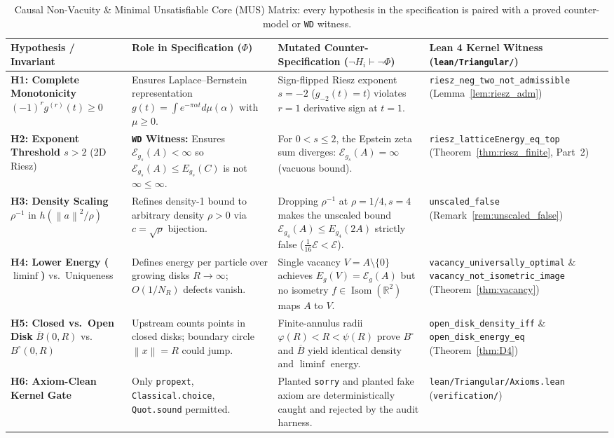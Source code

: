 \documentclass[11pt, a4paper]{article}
\theoremstyle{definition}
\theoremstyle{remark}
\newcommand{\R}{\mathbb{R}}
\newcommand{\Ecal}{\mathcal{E}}
\newcommand{\Bbar}{\overline{B}}
\newcommand{\Bopen}{B^{\circ}}
\newcommand{\norm}[1]{\left\lVert #1 \right\rVert}
\begin{document}
\begin{table}[htbp]
\centering
\small
\begin{tabular}{@{}>{\raggedright\arraybackslash}p{2.7cm}>{\raggedright\arraybackslash}p{3.8cm}>{\raggedright\arraybackslash}p{4.8cm}>{\raggedright\arraybackslash}p{3.9cm}@{}}
\toprule
\textbf{Hypothesis / Invariant} & \textbf{Role in Specification ($\Phi$)} & \textbf{Mutated Counter-Specification ($\neg H_i \vdash \neg \Phi$)} & \textbf{Lean 4 Kernel Witness (\texttt{lean/Triangular/})} \\
\midrule
\textbf{H1: Complete Monotonicity} $(-1)^r g^{(r)}(t) \ge 0$ & Ensures Laplace--Bernstein representation $g(t) = \int e^{-\pi\alpha t} d\mu(\alpha)$ with $\mu \ge 0$. & Sign-flipped Riesz exponent $s = -2$ ($g_{-2}(t) = t$) violates $r=1$ derivative sign at $t=1$. & \texttt{riesz\_neg\_two\_not\_admissible} (Lemma~\ref{lem:riesz_adm}) \\[0.5em]
\textbf{H2: Exponent Threshold $s > 2$} (2D Riesz) & \textbf{\texttt{WD} Witness:} Ensures $\Ecal_{g_s}(A) < \infty$ so $\Ecal_{g_s}(A) \le E_{g_s}(C)$ is not $\infty \le \infty$. & For $0 < s \le 2$, the Epstein zeta sum diverges: $\Ecal_{g_s}(A) = \infty$ (vacuous bound). & \texttt{riesz\_latticeEnergy\_eq\_top} (Theorem~\ref{thm:riesz_finite}, Part~2) \\[0.5em]
\textbf{H3: Density Scaling $\rho^{-1}$} in $h(\norm{a}^2/\rho)$ & Refines density-1 bound to arbitrary density $\rho > 0$ via $c = \sqrt{\rho}$ bijection. & Dropping $\rho^{-1}$ at $\rho = 1/4, s = 4$ makes the unscaled bound $\Ecal_{g_4}(A) \le E_{g_4}(2A)$ strictly false ($\frac{1}{16}\Ecal < \Ecal$). & \texttt{unscaled\_false} (Remark~\ref{rem:unscaled_false}) \\[0.5em]
\textbf{H4: Lower Energy ($\liminf$)} vs.\ Uniqueness & Defines energy per particle over growing disks $R \to \infty$; $O(1/N_R)$ defects vanish. & Single vacancy $V = A \setminus \{0\}$ achieves $E_g(V) = \Ecal_g(A)$ but no isometry $f \in \operatorname{Isom}(\R^2)$ maps $A$ to $V$. & \texttt{vacancy\_universally\_optimal} \& \texttt{vacancy\_not\_isometric\_image} (Theorem~\ref{thm:vacancy}) \\[0.5em]
\textbf{H5: Closed vs.\ Open Disk} $\Bbar(0,R)$ vs.\ $\Bopen(0,R)$ & Upstream counts points in closed disks; boundary circle $\norm{x}=R$ could jump. & Finite-annulus radii $\varphi(R) < R < \psi(R)$ prove $\Bopen$ and $\Bbar$ yield identical density and $\liminf$ energy. & \texttt{open\_disk\_density\_iff} \& \texttt{open\_disk\_energy\_eq} (Theorem~\ref{thm:D4}) \\[0.5em]
\textbf{H6: Axiom-Clean Kernel Gate} & Only \texttt{propext}, \texttt{Classical.choice}, \texttt{Quot.sound} permitted. & Planted \texttt{sorry} and planted fake axiom are deterministically caught and rejected by the audit harness. & \texttt{lean/Triangular/Axioms.lean} (\texttt{verification/}) \\
\bottomrule
\end{tabular}
\caption{Causal Non-Vacuity \& Minimal Unsatisfiable Core (MUS) Matrix: every hypothesis in the specification is paired with a proved counter-model or \texttt{WD} witness.}
\label{tab:causal_mus}
\end{table}
\newpage
\end{document}
